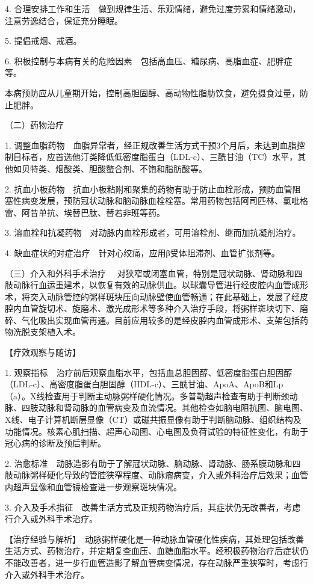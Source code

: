 4.
合理安排工作和生活　做到规律生活、乐观情绪，避免过度劳累和情绪激动，注意劳逸结合，保证充分睡眠。

5. 提倡戒烟、戒酒。

6.
积极控制与本病有关的危险因素　包括高血压、糖尿病、高脂血症、肥胖症等。

本病预防应从儿童期开始，控制高胆固醇、高动物性脂肪饮食，避免摄食过量，防止肥胖。

{（二）药物治疗}

1.
调整血脂药物　血脂异常者，经正规改善生活方式干预3个月后，未达到血脂控制目标者，应首选他汀类降低低密度脂蛋白（LDL-c）、三酰甘油（TC）水平，其他如贝特类、烟酸类、胆酸螯合剂、不饱和脂肪酸等。

2.
抗血小板药物　抗血小板粘附和聚集的药物有助于防止血栓形成，预防血管阻塞性病变发展，预防冠状动脉和脑动脉血栓栓塞。常用药物包括阿司匹林、氯吡格雷、阿昔单抗、埃替巴肽、替若非班等药。

3. 溶血栓和抗凝药物　对动脉内血栓形成者，可用溶栓剂、继而加抗凝剂治疗。

4. 缺血症状的对症治疗　针对心绞痛，应用β受体阻滞剂、血管扩张剂等。

{（三）介入和外科手术治疗}
　对狭窄或闭塞血管，特别是冠状动脉、肾动脉和四肢动脉行血运重建术，以恢复有效的动脉供血。以球囊导管进行经皮腔内血管成形术，将突入动脉管腔的粥样斑块压向动脉壁使血管畅通；在此基础上，发展了经皮腔内血管旋切术、旋磨术、激光成形术等多种介入治疗手段，将粥样斑块切下、磨碎、气化吸出实现血管再通。目前应用较多的是经皮腔内血管成形术、支架包括药物洗脱支架植入术。

【疗效观察与随访】

1.
观察指标　治疗前后观察血脂水平，包括血总胆固醇、低密度脂蛋白胆固醇（LDL-c）、高密度脂蛋白胆固醇（HDL-c）、三酰甘油、ApoA、ApoB和Lp（a）。X线检查用于判断主动脉粥样硬化情况。多普勒超声检查有助于判断颈动脉、四肢动脉和肾动脉的血管病变及血流情况。其他检查如脑电阻抗图、脑电图、X线、电子计算机断层显像（CT）或磁共振显像有助于判断脑动脉、组织结构及功能情况。核素心肌扫描、超声心动图、心电图及负荷试验的特征性变化，有助于冠心病的诊断及预后判断。

2.
治愈标准　动脉造影有助于了解冠状动脉、脑动脉、肾动脉、肠系膜动脉和四肢动脉粥样硬化导致的管腔狭窄程度、动脉瘤病变，介入或外科治疗后效果；血管内超声显像和血管镜检查进一步观察斑块情况。

3.
介入及手术指征　改善生活方式及正规药物治疗后，其症状仍无改善者，考虑行介入或外科手术治疗。

【治疗经验与解析】　动脉粥样硬化是一种动脉血管硬化性疾病，其处理包括改善生活方式、药物治疗，并定期复查血压、血糖血脂水平。经积极药物治疗后症状仍不能改善者，进一步行血管造影了解血管病变情况，存在动脉严重狭窄时，考虑行介入或外科手术治疗。


